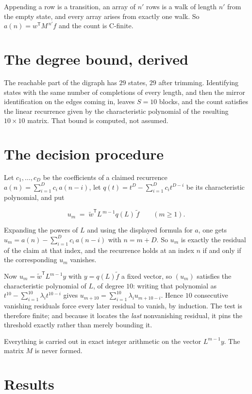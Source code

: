 \documentclass[11pt]{article}
\theoremstyle{definition}
\begin{document}
Appending a row is a transition, an array of $n'$ rows is a walk of length $n'$ from the empty state, and every array arises from exactly one walk. So $a(n) = w^{\mathsf T}M^{\,n'}f$ and the count is C-finite.

\section{The degree bound, derived}

The reachable part of the digraph has $29$ states, $29$ after trimming. Identifying states with the same number of completions of every length, and then the mirror identification on the edges coming in, leaves $S = 10$ blocks, and the count satisfies the linear recurrence given by the characteristic polynomial of the resulting $10\times10$ matrix. That bound is computed, not assumed.

\section{The decision procedure}

Let $c_1,\dots,c_D$ be the coefficients of a claimed recurrence $a(n) = \sum_{i=1}^{D} c_i\,a(n-i)$, let $q(t) = t^{D} - \sum_{i=1}^{D} c_i t^{D-i}$ be its characteristic polynomial, and put

\[u_m \;=\; \tilde w^{\mathsf T} L^{\,m-1} q(L)\,\tilde f \qquad (m \ge 1).\]

Expanding the powers of $L$ and using the displayed formula for $a$, one gets $u_m = a(n) - \sum_{i=1}^{D} c_i\,a(n-i)$ with $n = m + D$. So $u_m$ is exactly the residual of the claim at that index, and the recurrence holds at an index $n$ if and only if the corresponding $u_m$ vanishes.

Now $u_m = \tilde w^{\mathsf T} L^{m-1} y$ with $y = q(L)\tilde f$ a fixed vector, so $(u_m)$ satisfies the characteristic polynomial of $L$, of degree $10$: writing that polynomial as $t^{10} - \sum_{i=1}^{10} \lambda_i t^{10-i}$ gives $u_{m+10} = \sum_{i=1}^{10} \lambda_i u_{m+10-i}$. Hence $10$ consecutive vanishing residuals force every later residual to vanish, by induction. The test is therefore finite; and because it locates the {\itshape last} nonvanishing residual, it pins the threshold exactly rather than merely bounding it.

Everything is carried out in exact integer arithmetic on the vector $L^{m-1}y$. The matrix $M$ is never formed.

\section{Results}
\end{document}
